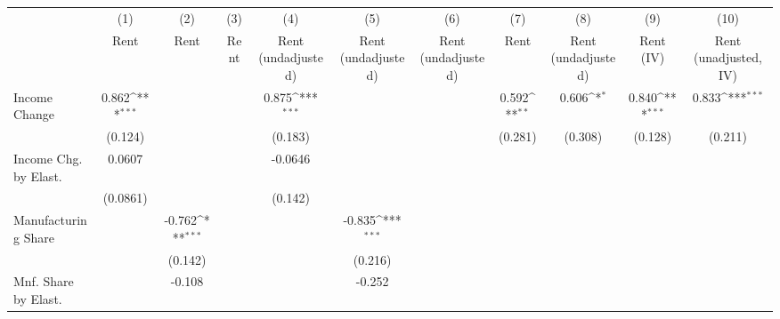 {
\def\sym#1{\ifmmode^{#1}\else\(^{#1}\)\fi}
\begin{tabular}{l*{10}{c}}
\hline\hline
                    &\multicolumn{1}{c}{(1)}&\multicolumn{1}{c}{(2)}&\multicolumn{1}{c}{(3)}&\multicolumn{1}{c}{(4)}&\multicolumn{1}{c}{(5)}&\multicolumn{1}{c}{(6)}&\multicolumn{1}{c}{(7)}&\multicolumn{1}{c}{(8)}&\multicolumn{1}{c}{(9)}&\multicolumn{1}{c}{(10)}\\
                    &\multicolumn{1}{c}{Rent}&\multicolumn{1}{c}{Rent}&\multicolumn{1}{c}{Rent}&\multicolumn{1}{c}{Rent (undadjusted)}&\multicolumn{1}{c}{Rent (undadjusted)}&\multicolumn{1}{c}{Rent (undadjusted)}&\multicolumn{1}{c}{Rent}&\multicolumn{1}{c}{Rent (undadjusted)}&\multicolumn{1}{c}{Rent (IV)}&\multicolumn{1}{c}{Rent (unadjusted, IV)}\\
\hline
Income Change       &       0.862\sym{***}&                     &                     &       0.875\sym{***}&                     &                     &       0.592\sym{**} &       0.606\sym{*}  &       0.840\sym{***}&       0.833\sym{***}\\
                    &     (0.124)         &                     &                     &     (0.183)         &                     &                     &     (0.281)         &     (0.308)         &     (0.128)         &     (0.211)         \\
[1em]
Income Chg. by Elast.&      0.0607         &                     &                     &     -0.0646         &                     &                     &                     &                     &                     &                     \\
                    &    (0.0861)         &                     &                     &     (0.142)         &                     &                     &                     &                     &                     &                     \\
[1em]
Manufacturing Share &                     &      -0.762\sym{***}&                     &                     &      -0.835\sym{***}&                     &                     &                     &                     &                     \\
                    &                     &     (0.142)         &                     &                     &     (0.216)         &                     &                     &                     &                     &                     \\
[1em]
Mnf. Share by Elast.&                     &      -0.108         &                     &                     &      -0.252         &                     &                     &                     &                     &                     \\

\end{tabular}}
